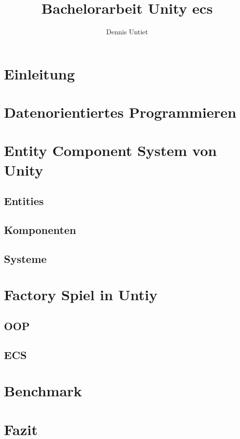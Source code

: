 \documentclass[12pt, titlepage]{article}
\title{Bachelorarbeit Unity ecs}
\author{Dennis Untiet}
\begin{document}
\begin{titlepage}
\maketitle
\end{titlepage}
\tableofcontents
\newpage
\section{Einleitung}
\newpage
\section{Datenorientiertes Programmieren}
\newpage
\section{Entity Component System von Unity}
\subsection{Entities}
\subsection{Komponenten}
\subsection{Systeme}
\newpage
\section{Factory Spiel in Untiy}
\subsection{OOP}
\subsection{ECS}
\newpage
\section{Benchmark}
\newpage
\section{Fazit}
\end{document}
